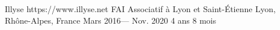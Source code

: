 \volunteerorganization%
{Illyse}%
{https://www.illyse.net}%
{FAI Associatif à Lyon et Saint-Étienne}%
{Lyon, Rhône-Alpes, France}%
{Mars 2016--- Nov. 2020}
{4 ans 8 mois}
